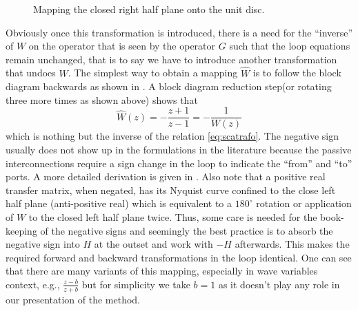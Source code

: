 \begin{figure}%
\centering
{}
\caption[Mapping the closed right half plane onto the unit disc.]%
{Mapping the closed right half plane onto the unit disc.}%
\label{fig:lit:smith}%
\end{figure}

Obviously once this transformation is introduced, there is a need for the \enquote{inverse} of $W$ on the operator that is seen
by the operator $G$ such that the loop equations remain unchanged, that is to say we have to introduce another transformation that undoes
$W$. The simplest way to obtain a mapping $\hat{W}$ is to follow the block diagram backwards as shown in 
. A block diagram reduction step(or rotating three more times as shown above) shows that 
\[
\hat{W}(z) = -\frac{z+1}{z-1} = -\frac{1}{W(z)}
\]
which is nothing but the inverse of the relation \eqref{eq:scatrafo}. The negative sign usually does not show up in 
the formulations in the literature because the passive interconnections 
require a sign change in the loop to indicate the \enquote{from} and \enquote{to} ports. A more detailed derivation
is given in \cite{colgate3}. Also note that a positive real transfer matrix, when negated, has its Nyquist curve 
confined to the close left half plane (anti-positive real) which is equivalent to a $180^\circ$ rotation or application
of $W$ to the closed left half plane twice. Thus, some care is needed for the book-keeping of the negative signs and 
seemingly the best practice is to absorb the negative sign into $H$ at the outset and work with $-H$ afterwards. This 
makes the required forward and backward transformations in the loop identical. One can see that there are many variants 
of this mapping, especially in wave variables context, e.g., $\frac{z-b}{z+b}$ but for simplicity we take $b=1$ as it 
doesn't play any role in our presentation of the method. 


